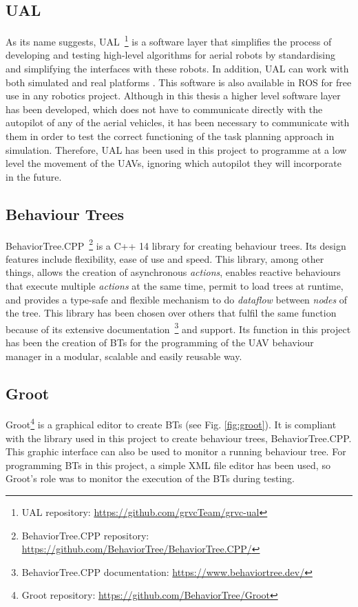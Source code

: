 \subsection{UAL}
\label{subsec:UAL}
As its name suggests, \gls{UAL}~\footnote{UAL repository: \url{https://github.com/grvcTeam/grvc-ual}} is a software layer that simplifies the process of developing and testing high-level algorithms for aerial robots by standardising and simplifying the interfaces with these robots. In addition, \gls{UAL} can work with both simulated and real platforms \cite{real_ijars20}. This software is also available in \gls{ROS} for free use in any robotics project. Although in this thesis a higher level software layer has been developed, which does not have to communicate directly with the autopilot of any of the aerial vehicles, it has been necessary to communicate with them in order to test the correct functioning of the task planning approach in simulation. Therefore, \gls{UAL} has been used in this project to programme at a low level the movement of the \glspl{UAV}, ignoring which autopilot they will incorporate in the future.

\subsection{Behaviour Trees}
\label{subsec:BehaviourTrees}
BehaviorTree.CPP~\footnote{BehaviorTree.CPP repository: \url{https://github.com/BehaviorTree/BehaviorTree.CPP/}} is a C++ 14 library for creating behaviour trees. Its design features include flexibility, ease of use and speed. This library, among other things, allows the creation of asynchronous \emph{actions}, enables reactive behaviours that execute multiple \emph{actions} at the same time, permit to load trees at runtime, and provides a type-safe and flexible mechanism to do \emph{dataflow} between \emph{nodes} of the tree. This library has been chosen over others that fulfil the same function because of its extensive documentation~\footnote{BehaviorTree.CPP documentation: \url{https://www.behaviortree.dev/}} and support. Its function in this project has been the creation of \glspl{BT} for the programming of the \gls{UAV} behaviour manager in a modular, scalable and easily reusable way.

\subsection{Groot}
\label{subsec:Groot}
Groot\footnote{Groot repository: \url{https://github.com/BehaviorTree/Groot}} is a graphical editor to create \glspl{BT} (see Fig. \ref{fig:groot}). It is compliant with the library used in this project to create behaviour trees, BehaviorTree.CPP. This graphic interface can also be used to monitor a running behaviour tree. For programming \glspl{BT} in this project, a simple XML file editor has been used, so Groot's role was to monitor the execution of the \glspl{BT} during testing.

